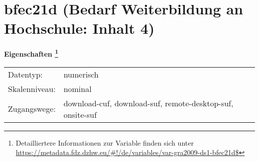
    \setcounter{footnote}{0}

    \vspace*{-1.8cm}
	\section{bfec21d (Bedarf Weiterbildung an Hochschule: Inhalt 4)}
	\label{section:bfec21d}



    \vspace*{0.5cm}
    \noindent\textbf{Eigenschaften
	\footnote{Detailliertere Informationen zur Variable finden sich unter
		\url{https://metadata.fdz.dzhw.eu/\#!/de/variables/var-gra2009-ds1-bfec21d$}}}\\
	\begin{tabularx}{\hsize}{@{}lX}
	Datentyp: & numerisch \\
	Skalenniveau: & nominal \\
	Zugangswege: &
	  download-cuf, 
	  download-suf, 
	  remote-desktop-suf, 
	  onsite-suf
 \\
    \end{tabularx}



